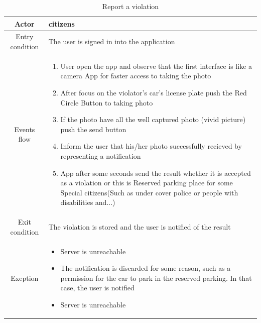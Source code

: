 \documentclass{article}
\begin{document}
		\begin{table} [H]
		\begin{center}
		\caption{Report a violation}
		\begin{tabular}{|c|p{8cm}|}
			\hline
			Actor			&	citizens\\
			\hline
			Entry condition	&	The user is signed in into the application\\
			\hline
			Events flow		&	\begin{enumerate}[noitemsep,topsep=0pt]
									\item User open the app and observe that the first
									 interface is like a camera App for faster access to
									  taking the photo			
									\item After focus on the violator's car's license
									 plate push the Red Circle Button to taking photo
									\item If the photo have all the well captured photo 
									(vivid picture) push the send button
									\item Inform the user that his/her photo successfully
									 recieved by representing a notification
									\item App after some seconds send the result whether it 
									is accepted as a violation or this is Reserved parking
									 place for some Special citizens(Such as under cover 
									 police or people with disabilities and...)
								\end{enumerate}\\
			\hline
			Exit condition	&	The violation is stored and the user is notified 
								of the result\\
			\hline
			Exeption			&	\begin{itemize}[noitemsep,topsep=0pt]
									\item Server is unreachable
									\item The notification is discarded for some reason,
									 such as a permission for the car to park in the 
									 reserved parking. In that case, the user is notified
									\item Server is unreachable
								\end{itemize}\\
			\hline
		\end{tabular}
		\end{center}
		\end{table} 
	
\end{document}
